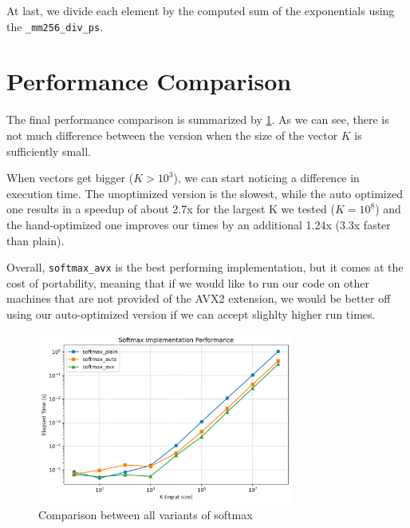 \documentclass[12pt,a4paper]{article}
\begin{document}
At last, we divide each element by the computed sum of the exponentials using the \texttt{\_mm256\_div\_ps}.

\section{Performance Comparison}
The final performance comparison is summarized by \cref{fig:comparison}. As we can see, there is not much difference between the version when the size of the vector $K$ is sufficiently small. 

When vectors get bigger ($K > 10^3$), we can start noticing a difference in execution time. The unoptimized version is the slowest, while the auto optimized one results in a speedup of about 2.7x for the largest K we tested ($K = 10^{8}$) and the hand-optimized one improves our times by an additional 1.24x (3.3x faster than plain).

Overall, \texttt{softmax\_avx} is the best performing implementation, but it comes at the cost of portability, meaning that if we would like to run our code on other machines that are not provided of the AVX2 extension, we would be better off using our auto-optimized version if we can accept slighlty higher run times.


\begin{figure}[h]
    \centering
    \includegraphics[width=0.75\textwidth]{notebooks/rep1_softmax_performance.png} 
    \caption{Comparison between all variants of softmax}   
    \label{fig:comparison}
\end{figure}
\end{document}
